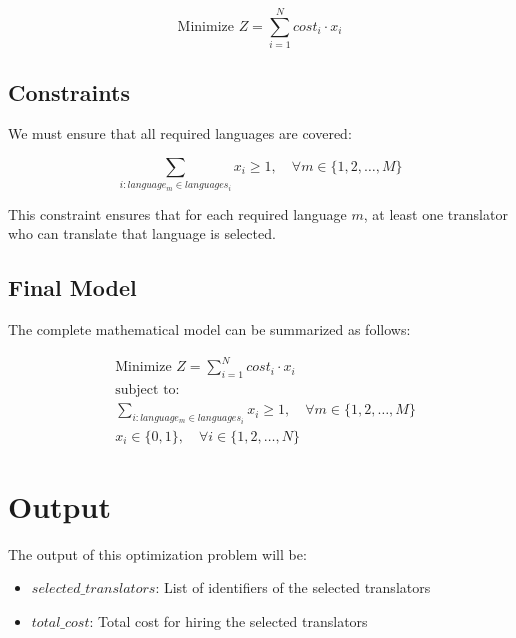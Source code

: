\documentclass{article}
\begin{document}
\[
\text{Minimize } Z = \sum_{i=1}^{N} cost_i \cdot x_i
\]

\subsection*{Constraints}
We must ensure that all required languages are covered:

\[
\sum_{i: language_m \in languages_i} x_i \geq 1, \quad \forall m \in \{1, 2, \ldots, M\}
\]

This constraint ensures that for each required language $m$, at least one translator who can translate that language is selected.

\subsection*{Final Model}
The complete mathematical model can be summarized as follows:

\begin{align*}
    & \text{Minimize } Z = \sum_{i=1}^{N} cost_i \cdot x_i \\
    & \text{subject to:} \\
    & \sum_{i: language_m \in languages_i} x_i \geq 1, \quad \forall m \in \{1, 2, \ldots, M\} \\
    & x_i \in \{0, 1\}, \quad \forall i \in \{1, 2, \ldots, N\}
\end{align*}

\section*{Output}
The output of this optimization problem will be:
\begin{itemize}
    \item $selected\_translators$: List of identifiers of the selected translators
    \item $total\_cost$: Total cost for hiring the selected translators
\end{itemize}
\end{document}
